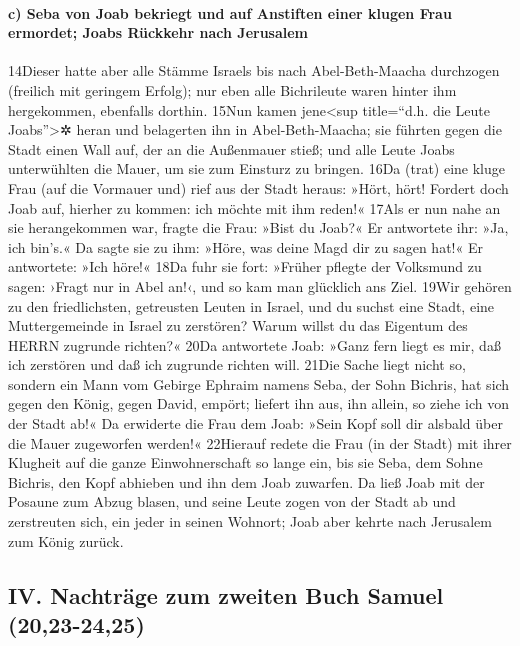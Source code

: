 \hypertarget{c-seba-von-joab-bekriegt-und-auf-anstiften-einer-klugen-frau-ermordet-joabs-ruxfcckkehr-nach-jerusalem}{%
\paragraph{c) Seba von Joab bekriegt und auf Anstiften einer klugen Frau
ermordet; Joabs Rückkehr nach
Jerusalem}\label{c-seba-von-joab-bekriegt-und-auf-anstiften-einer-klugen-frau-ermordet-joabs-ruxfcckkehr-nach-jerusalem}}

14Dieser hatte aber alle Stämme Israels bis nach Abel-Beth-Maacha
durchzogen (freilich mit geringem Erfolg); nur eben alle Bichrileute
waren hinter ihm hergekommen, ebenfalls dorthin. 15Nun kamen
jene\textless sup title=``d.h. die Leute Joabs''\textgreater✲ heran und
belagerten ihn in Abel-Beth-Maacha; sie führten gegen die Stadt einen
Wall auf, der an die Außenmauer stieß; und alle Leute Joabs unterwühlten
die Mauer, um sie zum Einsturz zu bringen. 16Da (trat) eine kluge Frau
(auf die Vormauer und) rief aus der Stadt heraus: »Hört, hört! Fordert
doch Joab auf, hierher zu kommen: ich möchte mit ihm reden!« 17Als er
nun nahe an sie herangekommen war, fragte die Frau: »Bist du Joab?« Er
antwortete ihr: »Ja, ich bin's.« Da sagte sie zu ihm: »Höre, was deine
Magd dir zu sagen hat!« Er antwortete: »Ich höre!« 18Da fuhr sie fort:
»Früher pflegte der Volksmund zu sagen: ›Fragt nur in Abel an!‹, und so
kam man glücklich ans Ziel. 19Wir gehören zu den friedlichsten,
getreusten Leuten in Israel, und du suchst eine Stadt, eine
Muttergemeinde in Israel zu zerstören? Warum willst du das Eigentum des
HERRN zugrunde richten?« 20Da antwortete Joab: »Ganz fern liegt es mir,
daß ich zerstören und daß ich zugrunde richten will. 21Die Sache liegt
nicht so, sondern ein Mann vom Gebirge Ephraim namens Seba, der Sohn
Bichris, hat sich gegen den König, gegen David, empört; liefert ihn aus,
ihn allein, so ziehe ich von der Stadt ab!« Da erwiderte die Frau dem
Joab: »Sein Kopf soll dir alsbald über die Mauer zugeworfen werden!«
22Hierauf redete die Frau (in der Stadt) mit ihrer Klugheit auf die
ganze Einwohnerschaft so lange ein, bis sie Seba, dem Sohne Bichris, den
Kopf abhieben und ihn dem Joab zuwarfen. Da ließ Joab mit der Posaune
zum Abzug blasen, und seine Leute zogen von der Stadt ab und zerstreuten
sich, ein jeder in seinen Wohnort; Joab aber kehrte nach Jerusalem zum
König zurück.

\hypertarget{iv.-nachtruxe4ge-zum-zweiten-buch-samuel-2023-2425}{%
\subsection{IV. Nachträge zum zweiten Buch Samuel
(20,23-24,25)}\label{iv.-nachtruxe4ge-zum-zweiten-buch-samuel-2023-2425}}

